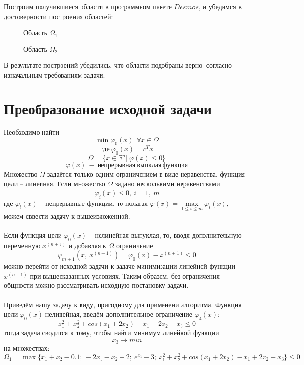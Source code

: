 \documentclass{article}
\begin{document}
\noindent Построим получившиеся области в программном пакете $Desmos$, и убедимся в достоверности построения областей:
\begin{figure}[H]
\label{fig:image}
\caption{Область $\Omega_1$}
\end{figure}

\begin{figure}[H]
\label{fig:image}
\caption{Область $\Omega_2$}
\end{figure}

\noindent В результате построений убедились, что области подобраны верно, согласно изначальным требованиям задачи.
    
\section{Преобразование исходной задачи}
\noindent Необходимо найти
$$\min{\varphi_0(x)}~~\forall x \in \Omega$$
$$где~\varphi_0(x)=c^Tx$$
$$\Omega = \{x \in \mathbb R^{n}|~\varphi(x)\le 0\}$$
$$\varphi(x)~-~непрерывная~выпклая~функция$$
Множество $\Omega$ задаётся только одним ограничением в виде неравенства, функция цели -- линейная. Если множество $\Omega$ задано несколькими неравенствами
$$\varphi_i(x)\le0,~i=\overline{1,~m}$$
где $\varphi_i(x)$ -- непрерывные функции, то полагая $\varphi(x)=\max \limits_{1\le i\le m} \varphi_i(x)$, можем сввести задачу к вышеизложенной.\\\\
\noindent Если функция цели $\varphi_0(x)$ -- нелинейная выпуклая, то, вводя дополнительную переменную $x^{(n+1)}$ и добавляя к $\Omega$ ограничение $$\varphi_{m+1}(x,~x^{(n+1)})=\varphi_0(x)-x^{(n+1)}\le 0$$
можно перейти от исходной задачи к задаче минимизации линейной функции $x^{(n+1)}$ при вышесказанных условиях. Таким образом, без ограничения общности можно рассматривать исходную постановку задачи.
\\\\ Приведём нашу задачу к виду, пригодному для применени алгоритма.
Функция цели $\varphi_0(x)$ нелинейная, введём дополнительное ограничение $\varphi_4(x)$:
$$x_1^{2}+x_2^{2}+cos(x_1+2x_2)-x_1+2x_2-x_3 \le 0$$
тогда задача сводится к тому, чтобы найти минимум линейной функции
$${x_3} \rightarrow min$$
на множествах:
\begin{equation*}
    \Omega_1 = \max \{ 
     x_1+x_2-0.1;~
    -2x_1-x_2 - 2;~
    e^{x_1} - 3 ;~
    x_1^{2}+x_2^{2}+cos(x_1+2x_2)-x_1+2x_2-x_3\} \le 0
\end{equation*}
\end{document}
